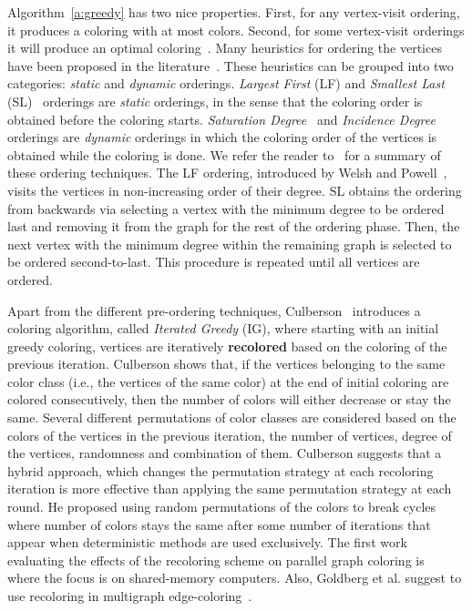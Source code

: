 \documentclass{article}
\begin{document}
Algorithm~\ref{a:greedy} has two nice properties. First, for any
vertex-visit ordering, it produces a coloring with at most
 colors. Second, for some vertex-visit orderings it will
produce an optimal coloring~\cite{GMP05}. Many heuristics for ordering
the vertices have been proposed in the literature~\cite{GMP05}. These
heuristics can be grouped into two categories: {\em static} and {\em
  dynamic} orderings.  {\em Largest First} (LF) and {\em Smallest
  Last} (SL)~\cite{Matula1983} orderings are {\em static} orderings,
in the sense that the coloring order is obtained before the coloring
starts. {\em Saturation Degree}~\cite{Brelaz1979} and {\em Incidence
  Degree} orderings are {\em dynamic} orderings in which the coloring
order of the vertices is obtained while the coloring is done. We refer
the reader to~\cite{GMP05} for a summary of these ordering
techniques. The LF ordering, introduced by Welsh and
Powell~\cite{Welsh01011967}, visits the vertices in non-increasing
order of their degree. SL obtains the ordering from backwards via selecting a
vertex with the minimum degree to be ordered last and removing it from
the graph for the rest of the ordering phase. Then, the next vertex
with the minimum degree within the remaining graph is selected to be
ordered second-to-last. This procedure is repeated until all vertices
are ordered. 

Apart from the different pre-ordering techniques,
Culberson~\cite{Culberson92iteratedgreedy} introduces a coloring
algorithm, called {\em Iterated Greedy} (IG), where starting with an initial
greedy coloring, vertices are iteratively \textbf{recolored} based on the
coloring of the previous iteration. Culberson shows that, if the
vertices belonging to the same color class (i.e.,
the vertices of the same color) at the end of initial coloring are colored
consecutively, then the number of colors will either decrease or stay the
same. Several different permutations of color classes are considered
based on the colors of the vertices in the previous iteration, the
number of vertices, degree of the vertices, randomness
and combination of them. Culberson suggests that a hybrid approach, which
changes the permutation strategy at each recoloring iteration is more
effective than applying the same permutation strategy at each round. He proposed using 
random permutations of the colors to break cycles where number of colors stays the same after
some number of iterations that appear when deterministic methods are used exclusively.
The first work evaluating the effects of the recoloring scheme on parallel 
graph coloring is~\cite{Gebremedhin_parallelgraph} where the focus is
on shared-memory computers. Also, Goldberg et al. suggest to use recoloring
in multigraph edge-coloring~\cite{JGT:JGT3190080115}.
\end{document}
